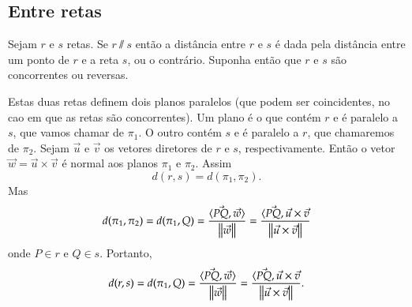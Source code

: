 
\subsection{Entre retas} %
\label{sub:entre_retas}

Sejam $r$ e $s$ retas. Se $r \varparallel s$ ent\~ao a dist\^ancia entre $r$ e $s$ \'e dada pela dist\^ancia entre um ponto de $r$ e a reta $s$, ou o contr\'ario. Suponha ent\~ao que $r$ e $s$ s\~ao concorrentes ou reversas. %

Estas duas retas definem dois planos paralelos (que podem ser coincidentes, no cao em que as retas s\~ao concorrentes). Um plano \'e o que cont\'em $r$ e \'e paralelo a $s$, que vamos chamar de $\pi_1$. O outro cont\'em $s$ e \'e paralelo a $r$, que chamaremos de $\pi_2$. Sejam $\vec{u}$ e $\vec{v}$ os vetores diretores de $r$ e $s$, respectivamente. Ent\~ao o vetor $\vec{w} = \vec{u}\times\vec{v}$ \'e normal aos planos $\pi_1$ e $\pi_2$. Assim
\[
    d(r,s) = d(\pi_1,\pi_2).
\]
Mas
\[
    d(\pi_1,\pi_2) = d(\pi_1, Q) = \dfrac{\langle\vec{PQ},\vec{w}\rangle}{\left\Vert{\vec{w}}\right\Vert} = \dfrac{\langle\vec{PQ},\vec{u}\times\vec{v}}{\left\Vert{\vec{u}\times\vec{v}}\right\Vert}
\]
onde $P \in r$ e $Q \in s$. Portanto,
\[
    d(r,s) = d(\pi_1, Q) = \dfrac{\langle\vec{PQ},\vec{w}\rangle}{\left\Vert{\vec{w}}\right\Vert} = \dfrac{\langle\vec{PQ},\vec{u}\times\vec{v}}{\left\Vert{\vec{u}\times\vec{v}}\right\Vert}.
\]

